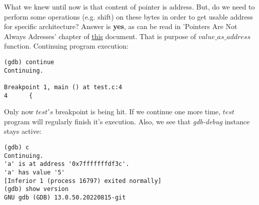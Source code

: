 \documentclass{report}
\begin{document}
What we knew until now is that content of pointer is address. But, do we need to perform some operations (e.g. shift) on these bytes in order to get usable address for specific architecture?
Answer is \textbf{yes}, as can be read in 'Pointers Are Not Always Adresses' chapter of \href{https://wwwcdf.pd.infn.it/localdoc/gdbint.pdf}{\underline{this}} document. That is purpose of $value\_as\_address$ function. Continuing program execution:
\begin{verbatim}
(gdb) continue
Continuing.

Breakpoint 1, main () at test.c:4
4      {
\end{verbatim}
Only now $test's$ breakpoint is being hit. If we continue one more time, $test$ program will regularly finish it's execution. Also, we see that \textit{gdb-debug} instance stays active:
\begin{verbatim}
(gdb) c
Continuing.
'a' is at address '0x7fffffffdf3c'.
'a' has value '5'
[Inferior 1 (process 16797) exited normally]
(gdb) show version
GNU gdb (GDB) 13.0.50.20220815-git
\end{verbatim}
\end{document}
